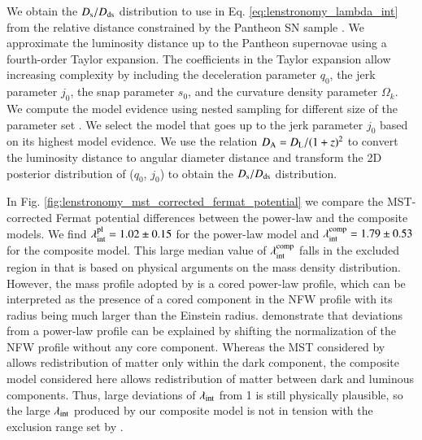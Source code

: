 \documentclass[longauth]{aa}
\newcommand{\ajs}[1]{{{#1}}}
\newcommand{\ajsii}[1]{{{#1}}}
\begin{document}
We obtain the $D_{\rm s}/D_{\rm ds}$ distribution to use in Eq. \ref{eq:lenstronomy_lambda_int} from the relative distance constrained by the Pantheon SN sample \citep{Scolnic18}. We approximate the luminosity distance up to the Pantheon supernovae using a fourth-order Taylor expansion. The coefficients in the Taylor expansion allow increasing complexity by including the deceleration parameter $q_0$, the jerk parameter $j_0$, the snap parameter $s_0$, and the curvature density parameter $\Omega_{k}$. We compute the model evidence using nested sampling for different size of the parameter set \citep{Skilling04}. We select the model that goes up to the jerk parameter $j_0$ based on its highest model evidence.  We use the relation $D_{\rm A} = D_{\rm L}/(1+z)^2$ to convert the luminosity distance to angular diameter distance and transform the 2D posterior distribution of ($q_0$, $j_0$) to obtain the $D_{\rm s}/D_{\rm ds}$ distribution.

In Fig. \ref{fig:lenstronomy_mst_corrected_fermat_potential} we compare the MST-corrected Fermat potential differences between the power-law and the composite models. We find $\lambda_{\rm int}^{\rm pl} = 1.02 \pm 0.15$ for the power-law model and $\lambda_{\rm int}^{\rm comp} = 1.79 \pm 0.53$ for the composite model. \ajs{This large median value of $\lambda_{\rm int}^{\rm comp}$ falls in the excluded region in \citet[][TDCOSMO-IV]{Birrer20} that is based on physical arguments on the mass density distribution. However, the mass profile adopted by \citet{Birrer20} is a cored power-law profile, which can be interpreted as the presence of a cored component in the NFW profile with its radius being much larger than the Einstein radius. \citet{Shajib21} demonstrate that deviations from a power-law profile can be explained by shifting the normalization of the NFW profile without any core component. \ajsii{Whereas the MST considered by \citet[][TDCOSMO-IV]{Birrer20} allows redistribution of matter only within the dark component, the composite model considered here allows redistribution of matter between dark and luminous components.} Thus, large deviations of $\lambda_{\rm int}$ from 1 is still physically plausible, so the large $\lambda_{\rm int}$ produced by our composite model is not in tension with the exclusion range set by \citet[][TDCOSMO-IV]{Birrer20}.
}
\end{document}
